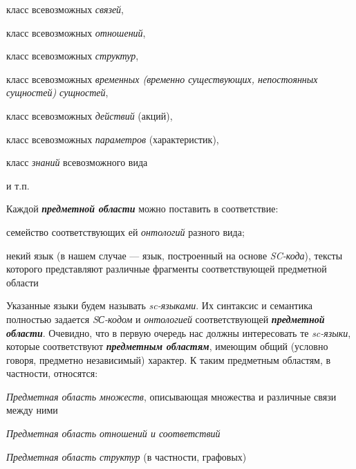 \begin{SCn}
\begin{scnsubstruct}
\begin{scnsubstruct}
{\begin{scnitemize}
\begin{scnitemizeii}
                        \item класс всевозможных \textit{связей},
                        \item класс всевозможных \textit{отношений},
                        \item класс всевозможных \textit{структур},
                        \item класс всевозможных \textit{временных (временно существующих, непостоянных сущностей) сущностей},
                        \item класс всевозможных \textit{действий} (акций),
                        \item класс всевозможных \textit{параметров} (характеристик),
                        \item класс \textit{знаний} всевозможного вида
                        \item и т.п.
                    \end{scnitemizeii}
                \end{scnitemize}
                Каждой \textbf{\textit{предметной области}} можно поставить в соответствие:
                \begin{scnitemize}
                    \item семейство соответствующих ей \textit{онтологий} разного вида;
                    \item некий язык (в нашем случае --- язык, построенный на основе \textit{SC-кода}), тексты которого представляют различные фрагменты соответствующей предметной области
                \end{scnitemize}
                Указанные языки будем называть \textit{sc-языками}. Их синтаксис и семантика полностью задается \textit{SС-кодом} и \textit{онтологией} соответствующей \textbf{\textit{предметной области}}. Очевидно, что в первую очередь нас должны интересовать те \textit{sc-языки}, которые соответствуют \textbf{\textit{предметным областям}}, имеющим общий (условно говоря, предметно независимый) характер. К таким предметным областям, в частности, относятся:
                \begin{scnitemize}
                    \item \textit{Предметная область множеств}, описывающая множества и различные связи между ними
                    \item \textit{Предметная область отношений и соответствий}
                    \item \textit{Предметная область структур} (в частности, графовых)

\end{scnitemize}}
\end{scnsubstruct}
\end{scnsubstruct}
\end{SCn}
